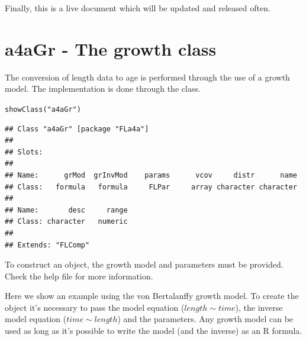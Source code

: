 \documentclass[a4paper,english,10pt]{article}\usepackage[]{graphicx}\usepackage[]{color}
\makeatletter
\newcommand{\hlstr}[1]{\textcolor[rgb]{0.063,0.58,0.627}{#1}}%
\newcommand{\hlstd}[1]{\textcolor[rgb]{0.196,0.196,0.196}{#1}}%
\newcommand{\hlkwd}[1]{\textcolor[rgb]{0.78,0.227,0.412}{#1}}%
\newenvironment{kframe}{%
 \def\at@end@of@kframe{}%
 \ifinner\ifhmode%
  \def\at@end@of@kframe{\end{minipage}}%
  \begin{minipage}{\columnwidth}%
 \fi\fi%
 \def\FrameCommand##1{\hskip\@totalleftmargin \hskip-\fboxsep
 \colorbox{shadecolor}{##1}\hskip-\fboxsep
     \hskip-\linewidth \hskip-\@totalleftmargin \hskip\columnwidth}%
 \MakeFramed {\advance\hsize-\width
   \@totalleftmargin\z@ \linewidth\hsize
   \@setminipage}}%
 {\par\unskip\endMakeFramed%
 \at@end@of@kframe}
\newenvironment{knitrout}{}{} %
\makeatother
\begin{document}


Finally, this is a live document which will be updated and released often.



\section{a4aGr - The growth class}

The conversion of length data to age is performed through the use of a growth model. The implementation is done through the  class.

\begin{knitrout}
\color{fgcolor}\begin{kframe}
\begin{alltt}
\hlkwd{showClass}\hlstd{(}\hlstr{"a4aGr"}\hlstd{)}
\end{alltt}
\begin{verbatim}
## Class "a4aGr" [package "FLa4a"]
## 
## Slots:
##                                                                   
## Name:      grMod  grInvMod    params      vcov     distr      name
## Class:   formula   formula     FLPar     array character character
##                           
## Name:       desc     range
## Class: character   numeric
## 
## Extends: "FLComp"
\end{verbatim}
\end{kframe}
\end{knitrout}

To construct an  object, the growth model and parameters must be provided.
Check the help file for more information.

Here we show an example using the von Bertalanffy growth model. To create the  object it's necessary to pass the model equation ($length \sim time$), the inverse model equation ($time \sim length$) and the parameters. Any growth model can be used as long as it's possible to write the model (and the inverse) as an R formula.
\end{document}
